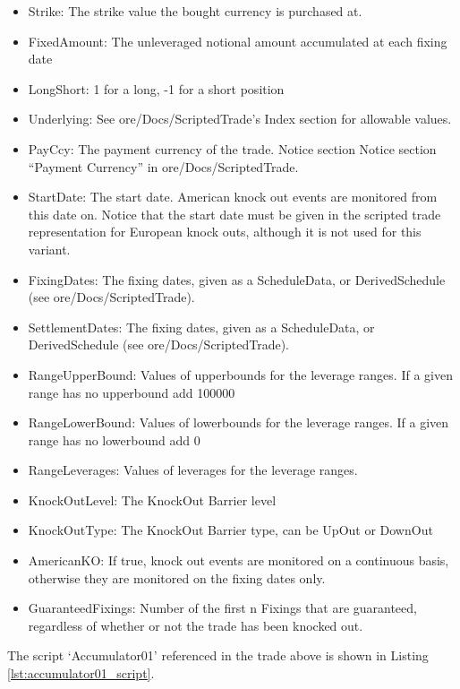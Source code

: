 \begin{itemize}
\item Strike: The strike value the bought currency is purchased at.
\item FixedAmount: The unleveraged notional amount accumulated at each fixing date
\item LongShort: 1 for a long, -1 for a short position
\item Underlying: See ore/Docs/ScriptedTrade's Index section for allowable values.
\item PayCcy: The payment currency of the trade. Notice section Notice section ``Payment Currency'' in ore/Docs/ScriptedTrade.
\item StartDate: The start date. American knock out events are monitored from this date on. Notice that the start date
  must be given in the scripted trade representation for European knock outs, although it is not used for this variant.
\item FixingDates: The fixing dates, given as a ScheduleData, or DerivedSchedule (see ore/Docs/ScriptedTrade).
\item SettlementDates: The fixing dates, given as a ScheduleData, or DerivedSchedule (see ore/Docs/ScriptedTrade).
\item RangeUpperBound: Values of upperbounds for the leverage ranges. If a given range has no upperbound add 100000
\item RangeLowerBound: Values of lowerbounds for the leverage ranges. If a given range has no lowerbound add 0
\item RangeLeverages: Values of leverages for the leverage ranges.
\item KnockOutLevel: The KnockOut Barrier level
\item KnockOutType: The KnockOut Barrier type, can be UpOut or DownOut
\item AmericanKO: If true, knock out events are monitored on a continuous basis, otherwise they are monitored on the
  fixing dates only.
\item GuaranteedFixings: Number of the first n Fixings that are guaranteed, regardless of whether or not the trade has been knocked out.
\end{itemize}

The script `Accumulator01' referenced in the trade above is shown in Listing \ref{lst:accumulator01_script}.

